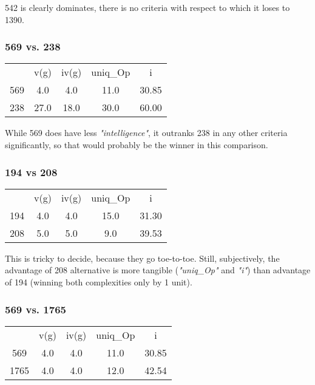 \documentclass{article}
\begin{document}
542 is clearly dominates, there is no criteria with respect to which it loses to 1390.

\subsubsection{569 vs. 238}

\begin{center}
\begin{tabular}{ |c|c|c|c|c| }
    & v(g) & iv(g) & uniq\_Op & i \\
    569 & 4.0 & 4.0 & 11.0 & 30.85 \\
    238 & 27.0 & 18.0 & 30.0 & 60.00
\end{tabular}
\end{center}

While 569 does have less \textit{"intelligence"}, it outranks 238 in any other criteria significantly, so that would probably be the winner in this comparison.

\subsubsection{194 vs 208}

\begin{center}
\begin{tabular}{ |c|c|c|c|c| }
    & v(g) & iv(g) & uniq\_Op & i \\
    194 & 4.0 & 4.0 & 15.0 & 31.30 \\
    208 & 5.0 & 5.0 & 9.0 & 39.53
\end{tabular}
\end{center}

This is tricky to decide, because they go toe-to-toe. Still, subjectively, the advantage of 208 alternative is more tangible (\textit{"uniq\_Op"} and \textit{"i"}) than advantage of 194 (winning both complexities only by 1 unit).

\subsubsection{569 vs. 1765}
\begin{center}
\begin{tabular}{ |c|c|c|c|c| }
    & v(g) & iv(g) & uniq\_Op & i \\
    569 & 4.0 & 4.0 & 11.0 & 30.85 \\
    1765 & 4.0 & 4.0 & 12.0 & 42.54
\end{tabular}
\end{center}
\end{document}
